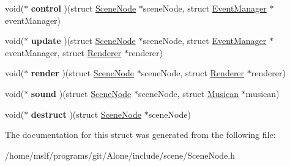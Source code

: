 \begin{DoxyCompactItemize}
void($\ast$ {\bfseries control} )(struct \hyperlink{struct_scene_node}{Scene\+Node} $\ast$scene\+Node, struct \hyperlink{struct_event_manager}{Event\+Manager} $\ast$event\+Manager)
\item 
\hypertarget{struct_scene_node_a6f53df0be4e8b1ea881a1612fecc6fd6}{}\label{struct_scene_node_a6f53df0be4e8b1ea881a1612fecc6fd6} 
void($\ast$ {\bfseries update} )(struct \hyperlink{struct_scene_node}{Scene\+Node} $\ast$scene\+Node, struct \hyperlink{struct_event_manager}{Event\+Manager} $\ast$event\+Manager, struct \hyperlink{struct_renderer}{Renderer} $\ast$renderer)
\item 
\hypertarget{struct_scene_node_addb4ef28bccaae82a75ab780569a3b58}{}\label{struct_scene_node_addb4ef28bccaae82a75ab780569a3b58} 
void($\ast$ {\bfseries render} )(struct \hyperlink{struct_scene_node}{Scene\+Node} $\ast$scene\+Node, struct \hyperlink{struct_renderer}{Renderer} $\ast$renderer)
\item 
\hypertarget{struct_scene_node_a2157f5f26dcdffd419c5c675961e9a8a}{}\label{struct_scene_node_a2157f5f26dcdffd419c5c675961e9a8a} 
void($\ast$ {\bfseries sound} )(struct \hyperlink{struct_scene_node}{Scene\+Node} $\ast$scene\+Node, struct \hyperlink{struct_musican}{Musican} $\ast$musican)
\item 
\hypertarget{struct_scene_node_a33da6753937fe159afc33054641a556f}{}\label{struct_scene_node_a33da6753937fe159afc33054641a556f} 
void($\ast$ {\bfseries destruct} )(struct \hyperlink{struct_scene_node}{Scene\+Node} $\ast$scene\+Node)
\end{DoxyCompactItemize}


The documentation for this struct was generated from the following file\+:\begin{DoxyCompactItemize}
\item 
/home/mslf/programs/git/\+Alone/include/scene/Scene\+Node.\+h\end{DoxyCompactItemize}

